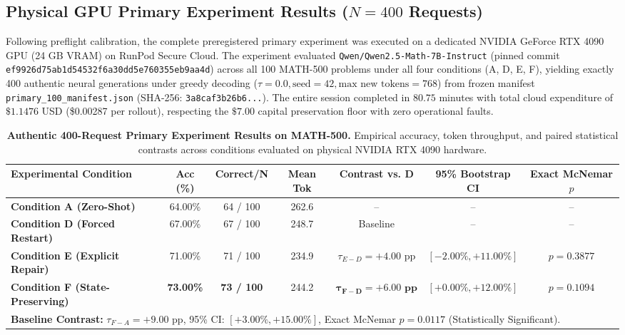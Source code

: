 \documentclass[11pt]{article}
\begin{document}
\subsection{Physical GPU Primary Experiment Results ($N = 400$ Requests)}
\label{sec:primary_400_results}
Following preflight calibration, the complete preregistered primary experiment was executed on a dedicated NVIDIA GeForce RTX 4090 GPU (24 GB VRAM) on RunPod Secure Cloud. The experiment evaluated \texttt{Qwen/Qwen2.5-Math-7B-Instruct} (pinned commit \texttt{ef9926d75ab1d54532f6a30dd5e760355eb9aa4d}) across all 100 MATH-500 problems under all four conditions (A, D, E, F), yielding exactly 400 authentic neural generations under greedy decoding ($\tau = 0.0, \text{seed} = 42, \text{max new tokens} = 768$) from frozen manifest \texttt{primary\_100\_manifest.json} (SHA-256: \texttt{3a8caf3b26b6...}). The entire session completed in $80.75$ minutes with total cloud expenditure of $\$1.1476$ USD (\$0.00287 per rollout), respecting the $\$7.00$ capital preservation floor with zero operational faults.

\begin{table}[t]
\centering
\small
\caption{\textbf{Authentic 400-Request Primary Experiment Results on MATH-500.} Empirical accuracy, token throughput, and paired statistical contrasts across conditions evaluated on physical NVIDIA RTX 4090 hardware.}
\label{tab:primary_400_results}
\begin{tabular}{lcccccc}
\toprule
\textbf{Experimental Condition} & \textbf{Acc (\%)} & \textbf{Correct/N} & \textbf{Mean Tok} & \textbf{Contrast vs. D} & \textbf{95\% Bootstrap CI} & \textbf{Exact McNemar $p$} \\
\midrule
\textbf{Condition A (Zero-Shot)} & 64.00\% & 64 / 100 & 262.6 & -- & -- & -- \\
\textbf{Condition D (Forced Restart)} & 67.00\% & 67 / 100 & 248.7 & Baseline & -- & -- \\
\textbf{Condition E (Explicit Repair)} & 71.00\% & 71 / 100 & 234.9 & $\tau_{E-D} = +4.00\text{ pp}$ & $[-2.00\%, +11.00\%]$ & $p = 0.3877$ \\
\textbf{Condition F (State-Preserving)} & \textbf{73.00\%} & \textbf{73 / 100} & 244.2 & $\mathbf{\tau_{F-D} = +6.00\text{ pp}}$ & $\mathbf{[+0.00\%, +12.00\%]}$ & $p = 0.1094$ \\
\midrule
\multicolumn{7}{l}{\textbf{Baseline Contrast:} $\tau_{F-A} = +9.00\text{ pp}$, 95\% CI: $[+3.00\%, +15.00\%]$, Exact McNemar $p = \mathbf{0.0117}$ (Statistically Significant).} \\
\bottomrule
\end{tabular}
\end{table}
\end{document}
